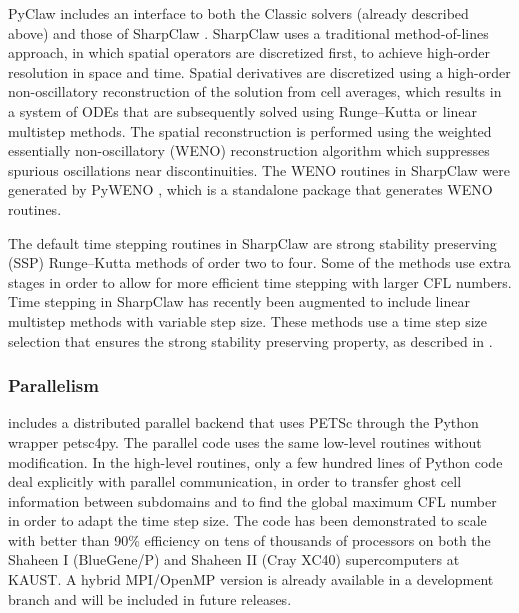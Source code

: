PyClaw includes an interface to both the Classic solvers (already described above)
and those of SharpClaw \cite{ketcheson2012pyclaw}.
SharpClaw uses a traditional method-of-lines approach, in which
spatial operators are discretized first, to achieve high-order
resolution in space and time.  Spatial derivatives are discretized
using a high-order non-oscillatory reconstruction of the solution from
cell averages, which results in a system of ODEs that are subsequently
solved using Runge--Kutta or linear multistep methods. The spatial
reconstruction is performed using the weighted essentially
non-oscillatory (WENO) reconstruction algorithm which suppresses
spurious oscillations near discontinuities.  The WENO routines in
SharpClaw were generated by PyWENO \cite{pyweno}, which is a standalone package
that generates WENO routines. 

The default time stepping routines in SharpClaw are strong stability
preserving (SSP) Runge--Kutta methods of order two to four.
Some of the methods use extra stages in order to allow for more efficient
time stepping with larger CFL numbers.
Time stepping in SharpClaw has recently been augmented to include 
linear multistep methods with variable step size.  These methods use
a time step size selection that ensures the strong stability preserving
property, as described in \cite{ssp_lmm_vss}.

\subsubsection{Parallelism}
\pyclaw includes a distributed parallel backend that uses PETSc through
the Python wrapper petsc4py.  The parallel code uses the same low-level
routines without modification.  In the high-level routines, only a few
hundred lines of Python code deal explicitly with parallel communication,
in order to transfer ghost cell information between subdomains and to
find the global maximum CFL number in order to adapt the time step
size.  The code has been demonstrated to scale with better than 90\%
efficiency on tens of thousands of processors on both the Shaheen I
(BlueGene/P) and Shaheen II (Cray XC40) supercomputers at KAUST.
A hybrid MPI/OpenMP version is already available in a development branch
and will be included in future releases.
